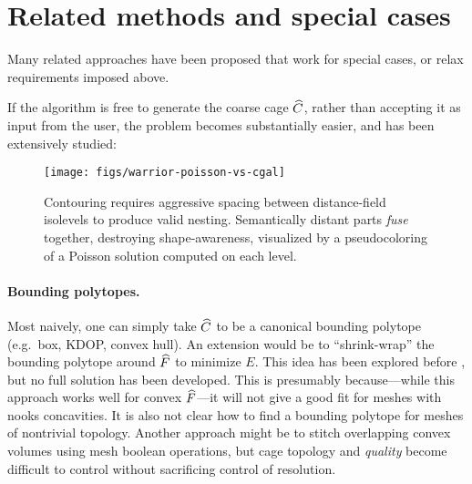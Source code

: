 \section{Related methods and special cases}

Many related approaches have been proposed that work for special cases, or
relax requirements imposed above.

If the algorithm is free to generate the coarse cage $\widehat{C}$, rather than
accepting it as input from the user, the problem becomes substantially easier,
and has been extensively studied:
%
\begin{figure}[b]
\texttt{[image: figs/warrior-poisson-vs-cgal]}
\caption{Contouring requires aggressive spacing between distance-field
isolevels to produce valid nesting. Semantically distant parts \emph{fuse}
together, destroying shape-awareness, visualized by a pseudocoloring of a
Poisson solution computed on each level.} \label{fig:warrior-poisson}
\end{figure}

\paragraph{Bounding polytopes.}
%
Most naively, one can simply take $\widehat{C}$ to be a canonical bounding polytope
(e.g.\ box, KDOP, convex hull). An extension would be to ``shrink-wrap'' the
bounding polytope around $\widehat{F}$ to minimize $E$. This idea has been explored
before \cite{Peterhans:2012,Wang:2013:HPE}, but no full solution has been
developed.
%
This is presumably because---while this approach works well for convex
$\widehat{F}$---it will not give a good fit for meshes with nooks  concavities. It is
also not clear how to find a bounding polytope for meshes of nontrivial
topology.
%
Another approach might be to stitch overlapping convex volumes
\cite{Xian:2012tv} using mesh boolean operations, but cage topology and
\emph{quality} become difficult to control without sacrificing control of
resolution.

